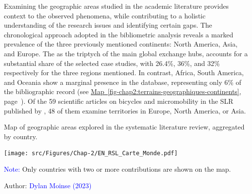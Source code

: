 \begin{refsegment}
Examining the geographic areas studied in the academic literature provides context to the observed phenomena, while contributing to a holistic understanding of the research issues and identifying certain gaps. The chronological approach adopted in the bibliometric analysis reveals a marked prevalence of the three previously mentioned continents: North America, Asia, and Europe. The  as the triptych of the main global exchange hubs, accounts for a substantial share of the selected case studies, with 26.4\%, 36\%, and 32\% respectively for the three regions mentioned. In contrast, Africa, South America, and Oceania show a marginal presence in the database, representing only 6\% of the bibliographic record (see \hyperref[fig-chap2:terrains-geographiques-continents]{Map~\ref{fig-chap2:terrains-geographiques-continents}}, page~\pageref{fig-chap2:terrains-geographiques-continents}). Of the 59 scientific articles on bicycles and micromobility in the \acrshort{SLR} published by \textcolor{blue}{\textcite[298]{zhang_built_2023}}, 48 of them examine territories in Europe, North America, or Asia.%

    \begin{carte}[h!]\vspace*{4pt}
        \caption{Map of geographic areas explored in the systematic literature review, aggregated by country.}
        \label{fig-chap2:terrains-geographiques-continents}
        \centerline{\texttt{[image: src/Figures/Chap-2/EN\_RSL\_Carte\_Monde.pdf]}}
        \vspace{5pt}
        \begin{flushleft}\scriptsize{
        \textcolor{blue}{Note:} Only countries with two or more contributions are shown on the map.
        }\end{flushleft}
        \begin{flushright}\scriptsize{
        Author: \textcolor{blue}{Dylan Moinse (2023)}
        }\end{flushright}
    \end{carte}


\end{refsegment}
